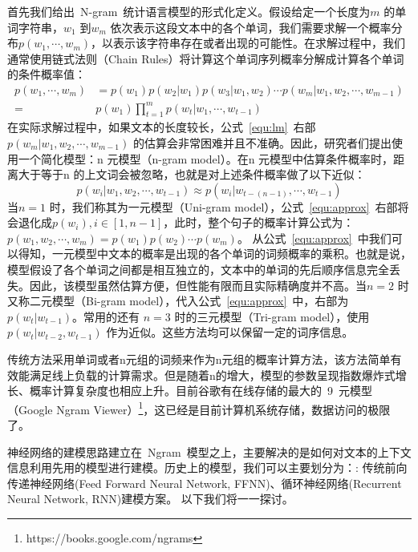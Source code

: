 首先我们给出~N-gram~统计语言模型的形式化定义。假设给定一个长度为$m$ 的单词字符串，$w_1$ 到$w_m$ 依次表示这段文本中的各个单词，我们需要求解一个概率分布$p(w_1,\cdots,w_m)$，以表示该字符串存在或者出现的可能性。在求解过程中，我们通常使用链式法则（Chain Rules）将计算这个单词序列概率分解成计算各个单词的条件概率值：
\begin{equation}
\label{equ:lm}
\begin{split}
p(w_1,\cdots,w_m) &= p(w_1) p(w_2|w_1) p(w_3|w_1,w_2)\cdots p(w_m | w_1,w_2,\cdots,w_{m-1}) \\
=&p(w_1)\prod_{t=1}^{m}p(w_t|w_1,\cdots,w_{t-1})
\end{split}
\end{equation}
在实际求解过程中，如果文本的长度较长，公式~\ref{equ:lm}~右部$ p(w_m | w_1,w_2,\cdots,w_{m-1}) $ 的估算会非常困难并且不准确。因此，研究者们提出使用一个简化模型：n 元模型（n-gram model）。在n 元模型中估算条件概率时，距离大于等于n 的上文词会被忽略，也就是对上述条件概率做了以下近似：
\begin{equation}
\label{equ:approx}
p(w_i | w_1,w_2,\cdots,w_{t-1})  \approx p(w_i | w_{t-(n-1)},\cdots,w_{t-1})
\end{equation}
当$n = 1$ 时，我们称其为一元模型（Uni-gram model），公式~\ref{equ:approx}~右部将会退化成$p(w_i),i\in [1,n-1]$，此时，整个句子的概率计算公式为：$p(w_1,w_2,\cdots,w_m) = p(w_1)p(w_2) \cdots p(w_m)$。
从公式~\ref{equ:approx}~中我们可以得知，一元模型中文本的概率是出现的各个单词的词频概率的乘积。也就是说，模型假设了各个单词之间都是相互独立的，文本中的单词的先后顺序信息完全丢失。因此，该模型虽然估算方便，但性能有限而且实际精确度并不高。当$n = 2$ 时又称二元模型（Bi-gram model），代入公式~\ref{equ:approx}~中，右部为 $p(w_t|w_{t-1})$。常用的还有 $n = 3$ 时的三元模型（Tri-gram model），使用$p(w_t |w_{t-2},w_{t-1})$ 作为近似。这些方法均可以保留一定的词序信息。

传统方法采用单词或者n元组的词频来作为n元组的概率计算方法，该方法简单有效能满足线上负载的计算需求。但是随着n的增大，模型的参数呈现指数爆炸式增长、概率计算复杂度也相应上升。目前谷歌有在线存储的最大的~9~元模型（Google Ngram Viewer）\footnote{https://books.google.com/ngrams}，这已经是目前计算机系统存储，数据访问的极限了。


神经网络的建模思路建立在~Ngram~模型之上，主要解决的是如何对文本的上下文信息利用先用的模型进行建模。历史上的模型，我们可以主要划分为：: 传统前向传递神经网络(Feed Forward Neural Network, FFNN)、循环神经网络(Recurrent Neural Network, RNN)建模方案。 以下我们将一一探讨。


